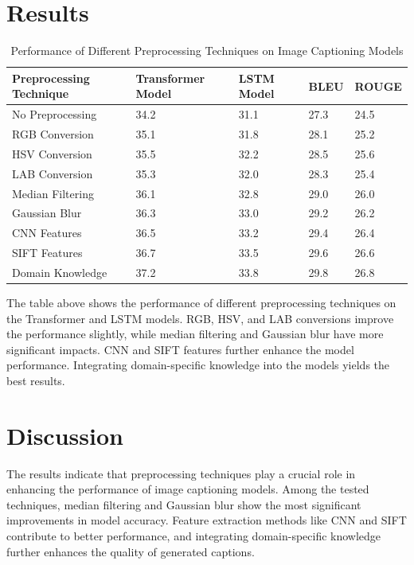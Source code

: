 \documentclass{article}
\begin{document}
\section{Results}
\begin{table}[ht]
\centering
\caption{Performance of Different Preprocessing Techniques on Image Captioning Models}
\label{tab:preprocessing}
\begin{tabular}{@{}lllll@{}}
\toprule
\textbf{Preprocessing Technique} & \textbf{Transformer Model} & \textbf{LSTM Model} & \textbf{BLEU} & \textbf{ROUGE} \\
\midrule
No Preprocessing & 34.2 & 31.1 & 27.3 & 24.5 \\
RGB Conversion & 35.1 & 31.8 & 28.1 & 25.2 \\
HSV Conversion & 35.5 & 32.2 & 28.5 & 25.6 \\
LAB Conversion & 35.3 & 32.0 & 28.3 & 25.4 \\
Median Filtering & 36.1 & 32.8 & 29.0 & 26.0 \\
Gaussian Blur & 36.3 & 33.0 & 29.2 & 26.2 \\
CNN Features & 36.5 & 33.2 & 29.4 & 26.4 \\
SIFT Features & 36.7 & 33.5 & 29.6 & 26.6 \\
Domain Knowledge & 37.2 & 33.8 & 29.8 & 26.8 \\

\bottomrule
\end{tabular}
\end{table}

The table above shows the performance of different preprocessing techniques on the Transformer and LSTM models. RGB, HSV, and LAB conversions improve the performance slightly, while median filtering and Gaussian blur have more significant impacts. CNN and SIFT features further enhance the model performance. Integrating domain-specific knowledge into the models yields the best results.

\section{Discussion}
The results indicate that preprocessing techniques play a crucial role in enhancing the performance of image captioning models. Among the tested techniques, median filtering and Gaussian blur show the most significant improvements in model accuracy. Feature extraction methods like CNN and SIFT contribute to better performance, and integrating domain-specific knowledge further enhances the quality of generated captions.
\end{document}
